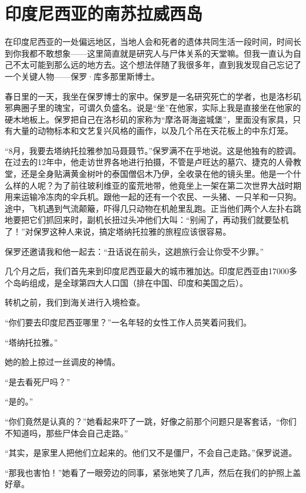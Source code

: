 \documentclass[12pt,oneside]{book}
\begin{document}
\section{印度尼西亚的南苏拉威西岛}
\begin{bookref}[frametitle={\cite{好好告别}}]

在印度尼西亚的一处偏远地区，当地人会和死者的遗体共同生活一段时间，时间长到你我都不敢想象——这里简直就是研究人与尸体关系的天堂嘛。但我一直认为自己不太可能到那么远的地方去。这个想法伴随了我很多年，直到我发现自己忘记了一个关键人物——保罗·库多那里斯博士。

春日里的一天，我坐在保罗博士的家中。保罗是一名研究死亡的学者，也是洛杉矶邪典圈子里的瑰宝，可谓久负盛名。说是“坐”在他家，实际上我是直接坐在他家的硬木地板上。保罗把自己在洛杉矶的家称为“摩洛哥海盗城堡”，里面没有家具，只有大量的动物标本和文艺复兴风格的画作，以及几个吊在天花板上的中东灯笼。

“8月，我要去塔纳托拉雅参加马聂聂节。”保罗满不在乎地说。这是他独有的腔调。在过去的12年中，他走访世界各地进行拍摄，不管是卢旺达的墓穴、捷克的人骨教堂，还是全身贴满黄金树叶的泰国僧侣木乃伊，全收录在他的镜头里。他是一个什么样的人呢？为了前往玻利维亚的蛮荒地带，他竟坐上一架在第二次世界大战时期用来运输冷冻肉的伞兵机。跟他一起的还有一个农民、一头猪、一只羊和一只狗。途中，飞机遇到气流颠簸，吓得几只动物在机舱里乱跑。正当他们两个人左扑右跳地要把它们抓回来时，副机长扭过头冲他们大叫：“别闹了，再动我们就要坠机了！”对保罗这种人来说，搞定塔纳托拉雅的旅程应该很容易。

保罗还邀请我和他一起去：“丑话说在前头，这趟旅行会让你受不少罪。”

几个月之后，我们首先来到印度尼西亚最大的城市雅加达。印度尼西亚由17000多个岛屿组成，是全球第四大人口国（排在中国、印度和美国之后）。

转机之前，我们到海关进行入境检查。

“你们要去印度尼西亚哪里？”一名年轻的女性工作人员笑着问我们。

“塔纳托拉雅。”

她的脸上掠过一丝调皮的神情。

“是去看死尸吗？”

“是的。”

“你们竟然是认真的？”她看起来吓了一跳，好像之前那个问题只是客套话，“你们不知道吗，那些尸体会自己走路。”

“其实，是家里人把他们立起来的。他们又不是僵尸，不会自己走路。”保罗说道。

“那我也害怕！”她看了一眼旁边的同事，紧张地笑了几声，然后在我们的护照上盖好章。


\end{bookref}
\end{document}
